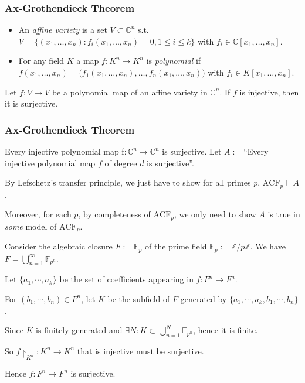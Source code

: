 \documentclass[UTF8,aspectratio=43,11pt,colorlinks,compress,openany]{beamer}%
\begin{document}
\begin{frame}\frametitle{Ax-Grothendieck Theorem}
\begin{itemize}
	\item An \emph{affine variety} is a set $V\subset\mathbb{C}^n$ s.t. $V=\big\{(x_1,\dots,x_n): f_i(x_1,\dots,x_n)=0, 1\leq i\leq k\big\}$ with $f_i\in\mathbb{C}[x_1,\dots,x_n]$.
	\item For any field $K$ a map $f: K^n\to K^n$ is \emph{polynomial} if $f(x_1,\dots,x_n)=\big(f_1(x_1,\dots,x_n),\dots,f_n(x_1,\dots,x_n)\big)$ with $f_i\in K[x_1,\dots,x_n]$.
\end{itemize}
	\begin{theorem}
		Let $f: V\to V$ be a polynomial map of an affine variety in $\mathbb{C}^n$. If $f$ is injective, then it is surjective.
	\end{theorem}
\end{frame}

\begin{frame}\frametitle{Ax-Grothendieck Theorem}
\setlength\abovedisplayskip{0pt}
\setlength\belowdisplayskip{0pt}
\begin{block}{Every injective polynomial map f$: \mathbb{C}^n\to \mathbb{C}^n$ is surjective.}
Let $A:=$``Every injective polynomial map $f$ of degree $d$ is surjective''.

By Lefschetz's transfer principle, we just have to show for all primes $p$, $\mathrm{ACF}_p\vdash A$.

Moreover, for each $p$, by completeness of $\mathrm{ACF}_p$, we only need to show $A$ is true in \emph{some} model of $\mathrm{ACF}_p$.

Consider the algebraic closure $F:=\overline{\mathbb{F}}_p$ of the prime field $\mathbb{F}_p:=\mathbb{Z}/p\mathbb{Z}$. We have $F=\bigcup\limits_{n=1}^\infty\mathbb{F}_{p^n}$.

Let $\{a_1, \cdots, a_k\}$ be the set of coefficients appearing in $f: F^n\to F^n$.

For $(b_1, \cdots, b_n) \in F^n$, let $K$ be the subfield of $F$ generated by $\{a_1, \cdots, a_k, b_1, \cdots, b_n\}$.

Since $K$ is finitely generated and $\exists N: K\subset\bigcup\limits_{n=1}^N\mathbb{F}_{p^n}$, hence it is finite.

So $f{\restriction_{K^n}}: K^n \to K^n$ that is injective must be surjective.

Hence $f: F^n\to F^n$ is surjective.
\end{block}
\end{frame}
\end{document}
